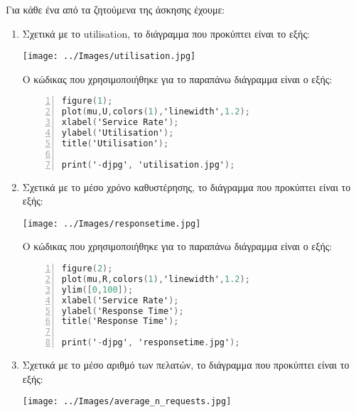 \documentclass[12pt]{article}
\begin{document}
\pagebreak

Για κάθε ένα από τα ζητούμενα της άσκησης έχουμε:
\begin{enumerate}
    \item{}
        Σχετικά με το utilisation, το διάγραμμα που προκύπτει είναι το εξής:
        \begin{center}
            \texttt{[image: ../Images/utilisation.jpg]}
        \end{center}

        Ο κώδικας που χρησιμοποιήθηκε για το παραπάνω διάγραμμα είναι ο εξής:
            \begin{lstlisting}[language=C,
                               frame=single,
                               numberstyle=\color{codegray},
                               basicstyle=\footnotesize,
                               numbers=left,
                               backgroundcolor=\color{lightgray},
                               numbersep=5pt]
figure(1); 
plot(mu,U,colors(1),'linewidth',1.2);
xlabel('Service Rate');
ylabel('Utilisation');
title('Utilisation');

print('-djpg', 'utilisation.jpg');
            \end{lstlisting}

    \pagebreak
    \item{}
        Σχετικά με το μέσο χρόνο καθυστέρησης, το διάγραμμα που προκύπτει είναι το εξής:
        \begin{center}
            \texttt{[image: ../Images/responsetime.jpg]}
        \end{center}

        Ο κώδικας που χρησιμοποιήθηκε για το παραπάνω διάγραμμα είναι ο εξής:
            \begin{lstlisting}[language=C,
                               frame=single,
                               numberstyle=\color{codegray},
                               basicstyle=\footnotesize,
                               numbers=left,
                               backgroundcolor=\color{lightgray},
                               numbersep=5pt]
figure(2);
plot(mu,R,colors(1),'linewidth',1.2);
ylim([0,100]);
xlabel('Service Rate');
ylabel('Response Time');
title('Response Time');

print('-djpg', 'responsetime.jpg');
            \end{lstlisting}

    \pagebreak
    \item{}
        Σχετικά με το μέσο αριθμό των πελατών, το διάγραμμα που προκύπτει είναι το εξής:
        \begin{center}
            \texttt{[image: ../Images/average\_n\_requests.jpg]}
        \end{center}


\end{enumerate}
\end{document}
